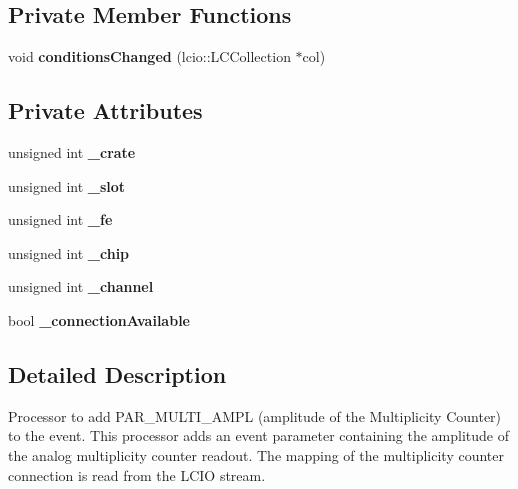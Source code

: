 \subsection*{Private Member Functions}
\begin{DoxyCompactItemize}
\item 
void {\bfseries conditionsChanged} (lcio::LCCollection $\ast$col)\label{classCALICE_1_1AppendMultiAmplitude_ae04c6bc30a5a1bfc4700c2575ae09a76}

\end{DoxyCompactItemize}
\subsection*{Private Attributes}
\begin{DoxyCompactItemize}
\item 
unsigned int {\bfseries \_\-crate}\label{classCALICE_1_1AppendMultiAmplitude_a4ecf8796bb93026dbf2d680b7dd70214}

\item 
unsigned int {\bfseries \_\-slot}\label{classCALICE_1_1AppendMultiAmplitude_a281f76046ded3a3aa7c5880242caf1bd}

\item 
unsigned int {\bfseries \_\-fe}\label{classCALICE_1_1AppendMultiAmplitude_a0b02671cdf754fc52ab8fa6348293431}

\item 
unsigned int {\bfseries \_\-chip}\label{classCALICE_1_1AppendMultiAmplitude_aa15678d8ba0780fad8c59e546087781d}

\item 
unsigned int {\bfseries \_\-channel}\label{classCALICE_1_1AppendMultiAmplitude_ab205e6309046702fb743238a594a14fd}

\item 
bool {\bfseries \_\-connectionAvailable}\label{classCALICE_1_1AppendMultiAmplitude_af350bb41fd000d9968f9097cb91ad771}

\end{DoxyCompactItemize}


\subsection{Detailed Description}
Processor to add PAR\_\-MULTI\_\-AMPL (amplitude of the Multiplicity Counter) to the event. This processor adds an event parameter containing the amplitude of the analog multiplicity counter readout. The mapping of the multiplicity counter connection is read from the LCIO stream.

